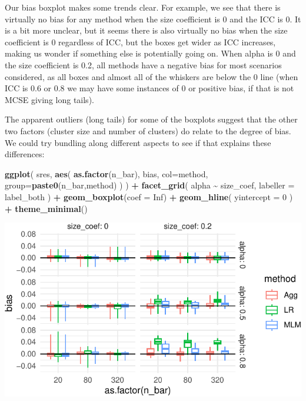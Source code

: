 \documentclass[
]{book}
\newenvironment{Shaded}{\begin{snugshade}}{\end{snugshade}}
\newcommand{\AttributeTok}[1]{\textcolor[rgb]{0.13,0.29,0.53}{#1}}
\newcommand{\ConstantTok}[1]{\textcolor[rgb]{0.56,0.35,0.01}{#1}}
\newcommand{\DecValTok}[1]{\textcolor[rgb]{0.00,0.00,0.81}{#1}}
\newcommand{\FunctionTok}[1]{\textcolor[rgb]{0.13,0.29,0.53}{\textbf{#1}}}
\newcommand{\NormalTok}[1]{#1}
\newcommand{\SpecialCharTok}[1]{\textcolor[rgb]{0.81,0.36,0.00}{\textbf{#1}}}
\begin{document}
Our bias boxplot makes some trends clear.
For example, we see that there is virtually no bias for any method when the size coefficient is 0 and the ICC is 0.
It is a bit more unclear, but it seems there is also virtually no bias when the size coefficient is 0 regardless of ICC, but the boxes get wider as ICC increases, making us wonder if something else is potentially going on.
When alpha is 0 and the size coefficient is 0.2, all methods have a negative bias for most scenarios considered, as all boxes and almost all of the whiskers are below the 0 line (when ICC is 0.6 or 0.8 we may have some instances of 0 or positive bias, if that is not MCSE giving long tails).

The apparent outliers (long tails) for some of the boxplots suggest that the other two factors (cluster size and number of clusters) do relate to the degree of bias. We could try bundling along different aspects to see if that explains these differences:

\begin{Shaded}
\begin{Highlighting}[]
\FunctionTok{ggplot}\NormalTok{( sres, }\FunctionTok{aes}\NormalTok{( }\FunctionTok{as.factor}\NormalTok{(n\_bar), bias, }\AttributeTok{col=}\NormalTok{method, }\AttributeTok{group=}\FunctionTok{paste0}\NormalTok{(n\_bar,method) ) ) }\SpecialCharTok{+}
  \FunctionTok{facet\_grid}\NormalTok{( alpha }\SpecialCharTok{\textasciitilde{}}\NormalTok{  size\_coef, }\AttributeTok{labeller =}\NormalTok{ label\_both ) }\SpecialCharTok{+}
  \FunctionTok{geom\_boxplot}\NormalTok{(}\AttributeTok{coef =} \ConstantTok{Inf}\NormalTok{) }\SpecialCharTok{+}
  \FunctionTok{geom\_hline}\NormalTok{( }\AttributeTok{yintercept =} \DecValTok{0}\NormalTok{ ) }\SpecialCharTok{+}
  \FunctionTok{theme\_minimal}\NormalTok{()}
\end{Highlighting}
\end{Shaded}

\begin{center}\includegraphics[width=0.75\linewidth]{Designing-Simulations-in-R_files/figure-latex/clusterRCT_plot_bias_v2-1} \end{center}
\end{document}
